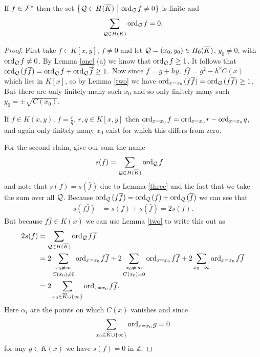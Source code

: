 \documentclass[english,11pt,a4paper]{article}
\begin{document}
\begin{lemma}\label{sform}
  If $f \in \mathcal{F}^*$ then the set $\big \{ \mathcal{Q} \in H(\overline K) \ \big | \ \text{ord}_{\mathcal{Q}}\hspace{0.4mm} f \neq 0 \big \}$ is finite and
  \begin{align*}
    \sum_{\mathcal{Q} \in H(\overline K)} \text{ord}_{\mathcal{Q}}\hspace{0.4mm} f = 0.
  \end{align*}
  \begin{proof}
    First take $f \in K[x,y]$, $f \neq 0$ and let $\mathcal{Q} = (x_0,y_0) \in H_0(\overline K)$, $y_0 \neq 0$, with $\text{ord}_{\mathcal{Q}}\hspace{0.4mm} f \neq 0$. By Lemma \ref{one} (a) we know that $\text{ord}_{\mathcal{Q}}\hspace{0.4mm} f \geq 1$. It follows that $\text{ord}_{\mathcal{Q}}\hspace{0.4mm} (f \overline f) = \text{ord}_{\mathcal{Q}}\hspace{0.4mm} f + \text{ord}_{\mathcal{Q}}\hspace{0.4mm} \overline f \geq 1$. Now since $f = g + h y$, $f \bar f = g^2 - h^2 C(x)$ which lies in $K[x]$, so by Lemma \ref{two} we have $\text{ord}_{x=x_0}\hspace{0.4mm} (f \overline f) = \text{ord}_{\mathcal{Q}}\hspace{0.4mm} (f \overline f) \geq 1$. But there are only finitely many such $x_0$ and so only finitely many such $y_0 = \pm \sqrt{C(x_0)}$.

    If $f \in K(x,y)$, $f = \frac r q$, $r, q \in K[x,y]$ then $\text{ord}_{x=x_0}\hspace{0.4mm} f = \text{ord}_{x=x_0}\hspace{0.4mm} r - \text{ord}_{x=x_0}\hspace{0.4mm} q$, and again only finitely many $x_0$ exist for which this differs from zero.

    For the second claim, give our sum the name
    \begin{align*}
      s(f) &= \sum_{\mathcal{Q} \in H(\overline K)} \text{ord}_{\mathcal{Q}}\hspace{0.4mm} f
    \end{align*}
    and note that $s(f) = s(\bar f)$ due to Lemma \ref{three} and the fact that we take the sum over all $\mathcal{Q}$. Because $\text{ord}_{\mathcal{Q}}\hspace{0.4mm} (f \overline f ) = \text{ord}_{\mathcal{Q}}\hspace{0.4mm} (f) + \text{ord}_{\mathcal{Q}}\hspace{0.4mm} ( \overline f )$ we can see that
    \begin{align*}
      s(f \bar f) &= s(f) + s(\bar f) = 2 s(f).
    \end{align*}
    But because $f \bar f \in K(x)$ we can use Lemma \ref{two} to write this out as
    \begin{align*}
      2s(f) &= \sum_{\mathcal{Q} \in H(\overline K)} \text{ord}_{\mathcal{Q}}\hspace{0.4mm} f \overline f\\
            &=2 \mathop{\sum_{x_0 \neq \infty}}_{C(x_0) \neq 0} \text{ord}_{x=x_0}\hspace{0.4mm} f \overline f 
            + 2 \mathop{\sum_{x_0 \neq \infty}}_{C(x_0) = 0} \text{ord}_{x=x_0}\hspace{0.4mm} f \overline f 
            + 2 \sum_{x_0 = \infty} \text{ord}_{x=x_0}\hspace{0.4mm} f \overline f\\
            &=2 \sum_{x_0 \in \overline K \cup \{ \infty \}} \text{ord}_{x=x_0}\hspace{0.4mm} f \overline f.
    \end{align*}
    Here $\alpha_i$ are the points on which $C(x)$ vanishes
    and since
    \begin{align*}
      \sum_{x_0 \in \overline K \cup \{ \infty \}} \text{ord}_{x=x_0}\hspace{0.4mm} g = 0
    \end{align*}
    for any $g \in K(x)$ we have $s(f) = 0$ in $\mathds{Z}$.
  \end{proof}
\end{lemma}
\end{document}
